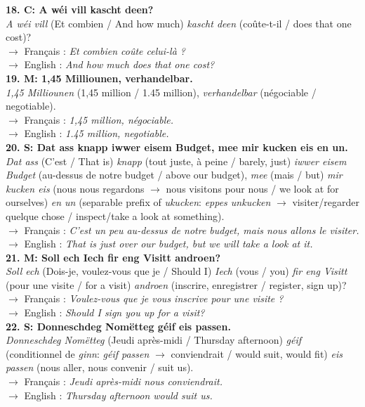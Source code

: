 \noindent\textbf{18. C: A wéi vill kascht deen?}\\
\textit{A wéi vill} (Et combien / And how much) \textit{kascht deen} (coûte-t-il / does that one cost)?\\
$\rightarrow$ Français : \textit{Et combien coûte celui-là ?}\\
$\rightarrow$ English : \textit{And how much does that one cost?}\\[0.5em]

\noindent\textbf{19. M: 1,45 Milliounen, verhandelbar.}\\
\textit{1,45 Milliounen} (1,45 million / 1.45 million), \textit{verhandelbar} (négociable / negotiable).\\
$\rightarrow$ Français : \textit{1,45 million, négociable.}\\
$\rightarrow$ English : \textit{1.45 million, negotiable.}\\[0.5em]

\noindent\textbf{20. S: Dat ass knapp iwwer eisem Budget, mee mir kucken eis en un.}\\
\textit{Dat ass} (C'est / That is) \textit{knapp} (tout juste, à peine / barely, just) \textit{iwwer eisem Budget} (au-dessus de notre budget / above our budget), \textit{mee} (mais / but) \textit{mir kucken eis} (nous nous regardons $\rightarrow$ nous visitons pour nous / we look at for ourselves) \textit{en un} (separable prefix of \textit{ukucken}: \textit{eppes unkucken} $\rightarrow$ visiter/regarder quelque chose / inspect/take a look at something).\\
$\rightarrow$ Français : \textit{C'est un peu au-dessus de notre budget, mais nous allons le visiter.}\\
$\rightarrow$ English : \textit{That is just over our budget, but we will take a look at it.}\\[0.5em]

\noindent\textbf{21. M: Soll ech Iech fir eng Visitt androen?}\\
\textit{Soll ech} (Dois-je, voulez-vous que je / Should I) \textit{Iech} (vous / you) \textit{fir eng Visitt} (pour une visite / for a visit) \textit{androen} (inscrire, enregistrer / register, sign up)?\\
$\rightarrow$ Français : \textit{Voulez-vous que je vous inscrive pour une visite ?}\\
$\rightarrow$ English : \textit{Should I sign you up for a visit?}\\[0.5em]

\noindent\textbf{22. S: Donneschdeg Nomëtteg géif eis passen.}\\
\textit{Donneschdeg Nomëtteg} (Jeudi après-midi / Thursday afternoon) \textit{géif} (conditionnel de \textit{ginn}: \textit{géif passen} $\rightarrow$ conviendrait / would suit, would fit) \textit{eis passen} (nous aller, nous convenir / suit us).\\
$\rightarrow$ Français : \textit{Jeudi après-midi nous conviendrait.}\\
$\rightarrow$ English : \textit{Thursday afternoon would suit us.}\\[0.5em]

